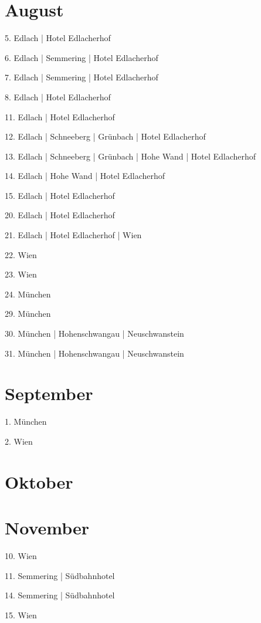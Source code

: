 \documentclass[twoside=false,titlepage=false,open=any, parskip=never, fontsize=10pt, headings=small, chapterprefix=false, appendixprefix=false, DIV=15]{scrbook}
\begin{document}
\begin{multicols}{3}
            \section*{August}
            5. Edlach | Hotel Edlacherhof\par
            6. Edlach | Semmering | Hotel Edlacherhof\par
            7. Edlach | Semmering | Hotel Edlacherhof\par
            8. Edlach | Hotel Edlacherhof\par
            11. Edlach | Hotel Edlacherhof\par
            12. Edlach | Schneeberg | Grünbach | Hotel Edlacherhof\par
            13. Edlach | Schneeberg | Grünbach | Hohe Wand | Hotel Edlacherhof\par
            14. Edlach | Hohe Wand | Hotel Edlacherhof\par
            15. Edlach | Hotel Edlacherhof\par
            20. Edlach | Hotel Edlacherhof\par
            21. Edlach | Hotel Edlacherhof | Wien\par
            22. Wien\par
            23. Wien\par
            24. München\par
            29. München\par
            30. München | Hohenschwangau | Neuschwanstein\par
            31. München | Hohenschwangau | Neuschwanstein\par
            \section*{September}
            1. München\par
            2. Wien\par
            \section*{Oktober}
            \section*{November}
            10. Wien\par
            11. Semmering | Südbahnhotel\par
            14. Semmering | Südbahnhotel\par
            15. Wien\par

\end{multicols}
\end{document}
